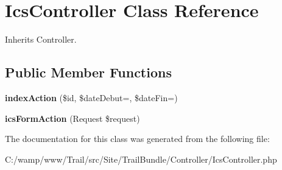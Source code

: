 \hypertarget{class_site_1_1_trail_bundle_1_1_controller_1_1_ics_controller}{}\section{Ics\+Controller Class Reference}
\label{class_site_1_1_trail_bundle_1_1_controller_1_1_ics_controller}


Inherits Controller.

\subsection*{Public Member Functions}
\begin{DoxyCompactItemize}
\item 
\hypertarget{class_site_1_1_trail_bundle_1_1_controller_1_1_ics_controller_a287160188c593a924ae8d7406d77df76}{}{\bfseries index\+Action} (\$id, \$date\+Debut=\textquotesingle{}\textquotesingle{}, \$date\+Fin=\textquotesingle{}\textquotesingle{})\label{class_site_1_1_trail_bundle_1_1_controller_1_1_ics_controller_a287160188c593a924ae8d7406d77df76}

\item 
\hypertarget{class_site_1_1_trail_bundle_1_1_controller_1_1_ics_controller_ae31a26d6241058124ac23e50a2372d38}{}{\bfseries ics\+Form\+Action} (Request \$request)\label{class_site_1_1_trail_bundle_1_1_controller_1_1_ics_controller_ae31a26d6241058124ac23e50a2372d38}

\end{DoxyCompactItemize}


The documentation for this class was generated from the following file\+:\begin{DoxyCompactItemize}
\item 
C\+:/wamp/www/\+Trail/src/\+Site/\+Trail\+Bundle/\+Controller/Ics\+Controller.\+php\end{DoxyCompactItemize}
